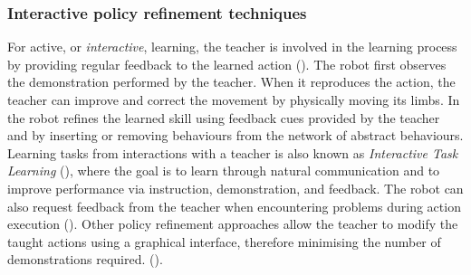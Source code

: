 
\subsubsection{Interactive policy refinement techniques}\label{subsec:Other RP Methods}
For active, or \textit{interactive}, learning, the teacher is involved in the learning process by providing regular feedback to the learned action  %
(\cite{nicolescu2003natural,calinon2007active,calinon2007incremental}).
The robot first observes the demonstration performed by the teacher. 
When it reproduces the action, the teacher can improve and correct the movement by physically moving its limbs.
In \cite{nicolescu2003natural} the robot refines the learned skill using feedback cues provided by the teacher and by inserting or removing behaviours from the network of abstract behaviours.
Learning tasks from interactions with a teacher is also known as \textit{Interactive Task Learning} (\cite{laird2017interactive}), where the goal is to learn through natural communication and to improve performance via instruction, demonstration, and feedback. 
The robot can also request feedback from the teacher when encountering problems during action execution (\cite{cakmak2012aaai,abdo2013learning,martinez2017relational}).
Other policy refinement approaches allow the teacher to modify the taught actions using a graphical interface, therefore minimising the number of demonstrations required.
 (\cite{alexandrova2015roboflow,perzylo2016intuitive,paxton2017costar,stenmark2017simplified}).

